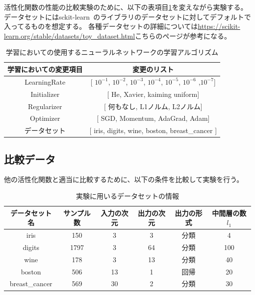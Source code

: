 活性化関数の性能の比較実験のために、以下の表項目\ref{list:learning_algorithm_change}を変えながら実験する。
データセットにはsckit-learn~\cite{scikit-learn}のライブラリのデータセットに対してデフォルトで入ってるものを想定する。
各種データセットの詳細については\url{https://scikit-learn.org/stable/datasets/toy_dataset.html}こちらのページが参考になる。



\begin{table}[htbp]
    \begin{center}
        \caption{学習においての使用するニューラルネットワークの学習アルゴリズム}
        \label{list:learning_algorithm_change}
        \vspace{2mm} 
        \begin{tabular}{ |c|c| }
        学習においての変更項目 & 変更のリスト\\
        \hline
        LearningRate           & [  $10^{-1}$,  $10^{-2}$,  $10^{-3}$,  $10^{-4}$, $10^{-5}$, $10^{-6}$ ,$10^{-7}$]    \\
        Initializer         & [ He, Xavier, kaiming uniform]   \\
        Regularizer           & [ 何もなし, L1ノルム, L2ノルム]     \\
        Optimizer         & [ SGD, Momentum, AdaGrad, Adam]   \\
        データセット &  [ iris, digits, wine, boston, breast\_cancer ]    \\
        \end{tabular}
    \end{center}
\end{table}



\subsection{比較データ}

他の活性化関数と適当に比較するために、以下の条件を比較して実験を行う。


\begin{table}[htbp]
    \begin{center}
        \caption{実験に用いるデータセットの情報}
        \label{dataset_name}
        \vspace{2mm} 
        \begin{tabular}{ |c|c|c|c|c|c| }
        データセット名 & サンプル数 & 入力の次元 & 出力の次元 & 出力の形式 & 中間層の数 $ {l_1} $ \\
        \hline
        iris           & 150    & 3         & 3        & 分類      & 4 \\
        digits         & 1797   & 3         & 64       & 分類      & 100 \\
        wine           & 178    & 3         & 13       & 分類      & 40 \\
        boston         & 506    & 13        & 1        & 回帰      & 20 \\
        breast\_cancer & 569    & 30        & 2        & 分類      & 30 \\
        \end{tabular}
    \end{center}
\end{table}


